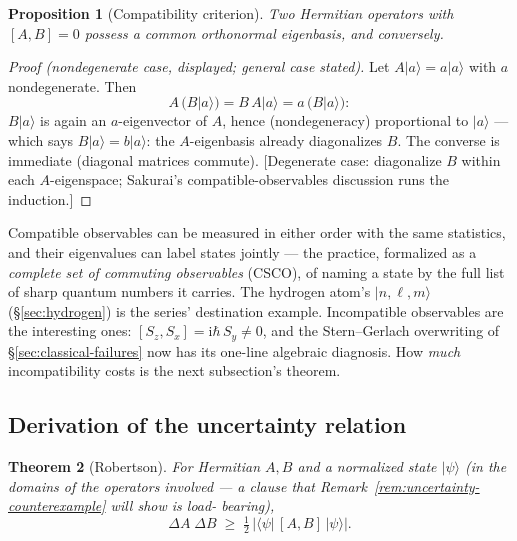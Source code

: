 \documentclass[11pt]{article}
\theoremstyle{plain}
\newtheorem{theorem}{Theorem}[section]
\newtheorem{proposition}[theorem]{Proposition}
\theoremstyle{definition}
\theoremstyle{remark}
\newcommand{\ii}{\mathrm{i}}
\newcommand{\ket}[1]{\lvert #1 \rangle}
\newcommand{\bra}[1]{\langle #1 \rvert}
\begin{document}
\begin{proposition}[Compatibility criterion]
\label{prop:compatibility}
Two Hermitian operators with $[A, B] = 0$ possess a common
orthonormal eigenbasis, and conversely.
\end{proposition}

\begin{proof}[Proof (nondegenerate case, displayed; general case
stated)]
Let $A\ket a = a\ket a$ with $a$ nondegenerate. Then
\begin{equation}
  A\,\bigl(B\ket a\bigr)
  = B\,A\ket a
  = a\,\bigl(B\ket a\bigr) :
\end{equation}
$B\ket a$ is again an $a$-eigenvector of $A$, hence (nondegeneracy)
proportional to $\ket a$ --- which says $B\ket a = b\ket a$: the
$A$-eigenbasis already diagonalizes $B$. The converse is immediate
(diagonal matrices commute). [Degenerate case: diagonalize $B$
within each $A$-eigenspace; Sakurai's compatible-observables
discussion runs the induction.]
\end{proof}

\noindent
Compatible observables can be measured in either order with the same
statistics, and their eigenvalues can label states jointly --- the
practice, formalized as a \emph{complete set of commuting
observables} (CSCO), of naming a state by the full list of sharp
quantum numbers it carries. The hydrogen atom's $\ket{n, \ell, m}$
(\S\ref{sec:hydrogen}) is the series' destination example.
Incompatible observables are the interesting ones:
$[S_z, S_x] = \ii\hbar\, S_y \ne 0$, and the Stern--Gerlach
overwriting of \S\ref{sec:classical-failures} now has its one-line
algebraic diagnosis. How \emph{much} incompatibility costs is the
next subsection's theorem.

\subsection{Derivation of the uncertainty relation}
\label{sec:uncertainty}

\begin{theorem}[Robertson]\label{thm:robertson}
For Hermitian $A, B$ and a normalized state $\ket\psi$ (in the
domains of the operators involved --- a clause that
Remark~\ref{rem:uncertainty-counterexample} will show is load-%
bearing),
\begin{equation}
  \boxed{\;
  \Delta A\;\Delta B
  \;\ge\;
  \tfrac12\,\bigl|\bra\psi\,[A, B]\,\ket\psi\bigr| .
  \;}
  \label{eq:robertson}
\end{equation}
\end{theorem}
\end{document}
